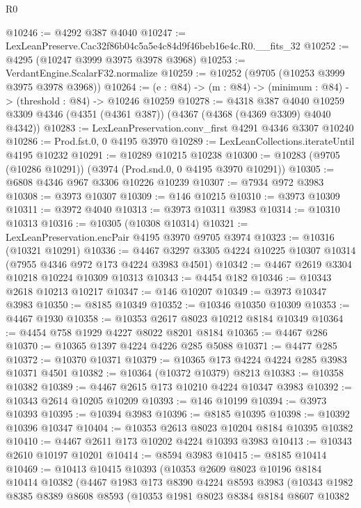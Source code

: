 \begin{lexlean}{R0}
\begin{coremodule}
@10246 := @4292 @387 @4040
@10247 := LexLeanPreserve.Cac32f86b04c5a5e4c84d9f46beb16e4c.R0.__fits_32
@10252 := @4295 (@10247 @3999 @3975 @3978 @3968)
@10253 := VerdantEngine.ScalarF32.normalize
@10259 := @10252 (@9705 (@10253 @3999 @3975 @3978 @3968))
@10264 := (e : @84) -> (m : @84) -> (minimum : @84) -> (threshold : @84) -> @10246 @10259
@10278 := @4318
    @387
    @4040
    @10259
    @3309
    @4346
    (@4351 (@4361 @387))
    (@4367 (@4368 (@4369 @3309) @4040 @4342))
@10283 := LexLeanPreservation.conv_first @4291 @4346 @3307 @10240
@10286 := Prod.fst.{0, 0} @4195 @3970
@10289 := LexLeanCollections.iterateUntil @4195 @10232
@10291 := @10289 @10215 @10238
@10300 := @10283 (@9705 (@10286 @10291)) (@3974 (Prod.snd.{0, 0} @4195 @3970 @10291))
@10305 := @6808 @4346 @967 @3306 @10226 @10239
@10307 := @7934 @972 @3983
@10308 := @3973 @10307
@10309 := @146 @10215
@10310 := @3973 @10309
@10311 := @3972 @4040
@10313 := @3973 @10311 @3983
@10314 := @10310 @10313
@10316 := @10305 (@10308 @10314)
@10321 := LexLeanPreservation.encPair @4195 @3970 @9705 @3974
@10323 := @10316 (@10321 @10291)
@10336 := @4467 @3297 @3305 @4224 @10225 @10307 @10314 (@7955 @4346 @972 @173 @4224 @3983 @4501)
@10342 := @4467 @2619 @3304 @10218 @10224 @10309 @10313
@10343 := @4454 @182
@10346 := @10343 @2618 @10213 @10217
@10347 := @146 @10207
@10349 := @3973 @10347 @3983
@10350 := @8185 @10349
@10352 := @10346 @10350 @10309
@10353 := @4467 @1930
@10358 := @10353 @2617 @8023 @10212 @8184 @10349
@10364 := @4454 @758 @1929 @4227 @8022 @8201 @8184
@10365 := @4467 @286
@10370 := @10365 @1397 @4224 @4226 @285 @5088
@10371 := @4477 @285
@10372 := @10370 @10371
@10379 := @10365 @173 @4224 @4224 @285 @3983 @10371 @4501
@10382 := @10364 (@10372 @10379) @8213
@10383 := @10358 @10382
@10389 := @4467 @2615 @173 @10210 @4224 @10347 @3983
@10392 := @10343 @2614 @10205 @10209
@10393 := @146 @10199
@10394 := @3973 @10393
@10395 := @10394 @3983
@10396 := @8185 @10395
@10398 := @10392 @10396 @10347
@10404 := @10353 @2613 @8023 @10204 @8184 @10395 @10382
@10410 := @4467 @2611 @173 @10202 @4224 @10393 @3983
@10413 := @10343 @2610 @10197 @10201
@10414 := @8594 @3983
@10415 := @8185 @10414
@10469 := @10413
    @10415
    @10393
    (@10353
      @2609
      @8023
      @10196
      @8184
      @10414
      @10382
      (@4467
        @1983
        @173
        @8390
        @4224
        @8593
        @3983
        (@10343
          @1982
          @8385
          @8389
          @8608
          @8593
          (@10353
            @1981
            @8023
            @8384
            @8184
            @8607
            @10382

\end{coremodule}
\end{lexlean}
